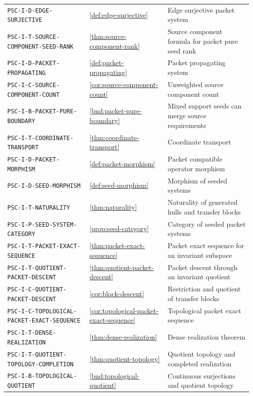 \begin{longtable}{@{}p{}p{}p{}@{}}
\nolinkurl{PSC-I-D-EDGE-SURJECTIVE} & \ref{def:edge-surjective} & Edge surjective packet system \\
\nolinkurl{PSC-I-T-SOURCE-COMPONENT-SEED-RANK} & \ref{thm:source-component-rank} & Source component formula for packet pure seed rank \\
\nolinkurl{PSC-I-D-PACKET-PROPAGATING} & \ref{def:packet-propagating} & Packet propagating system \\
\nolinkurl{PSC-I-C-SOURCE-COMPONENT-COUNT} & \ref{cor:source-component-count} & Unweighted source component count \\
\nolinkurl{PSC-I-B-PACKET-PURE-BOUNDARY} & \ref{bnd:packet-pure-boundary} & Mixed support seeds can merge source requirements \\
\nolinkurl{PSC-I-T-COORDINATE-TRANSPORT} & \ref{thm:coordinate-transport} & Coordinate transport \\
\nolinkurl{PSC-I-D-PACKET-MORPHISM} & \ref{def:packet-morphism} & Packet compatible operator morphism \\
\nolinkurl{PSC-I-D-SEED-MORPHISM} & \ref{def:seed-morphism} & Morphism of seeded systems \\
\nolinkurl{PSC-I-T-NATURALITY} & \ref{thm:naturality} & Naturality of generated hulls and transfer blocks \\
\nolinkurl{PSC-I-P-SEED-SYSTEM-CATEGORY} & \ref{prop:seed-category} & Category of seeded packet systems \\
\nolinkurl{PSC-I-T-PACKET-EXACT-SEQUENCE} & \ref{thm:packet-exact-sequence} & Packet exact sequence for an invariant subspace \\
\nolinkurl{PSC-I-T-QUOTIENT-PACKET-DESCENT} & \ref{thm:quotient-packet-descent} & Packet descent through an invariant quotient \\
\nolinkurl{PSC-I-C-QUOTIENT-PACKET-DESCENT} & \ref{cor:block-descent} & Restriction and quotient of transfer blocks \\
\nolinkurl{PSC-I-C-TOPOLOGICAL-PACKET-EXACT-SEQUENCE} & \ref{cor:topological-packet-exact-sequence} & Topological packet exact sequence \\
\nolinkurl{PSC-I-T-DENSE-REALIZATION} & \ref{thm:dense-realization} & Dense realization theorem \\
\nolinkurl{PSC-I-T-QUOTIENT-TOPOLOGY-COMPLETION} & \ref{thm:quotient-topology} & Quotient topology and completed realization \\
\nolinkurl{PSC-I-B-TOPOLOGICAL-QUOTIENT} & \ref{bnd:topological-quotient} & Continuous surjections and quotient topology \\

\end{longtable}
